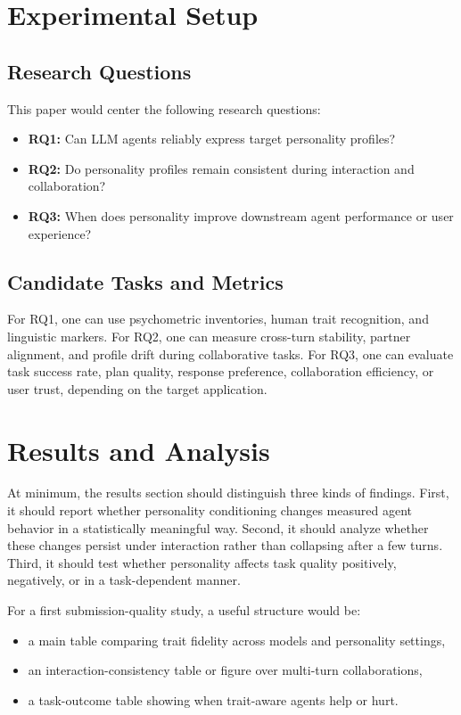 \documentclass[11pt]{article}
\begin{document}
\section{Experimental Setup}

\subsection{Research Questions}
This paper would center the following research questions:
\begin{itemize}
    \item \textbf{RQ1:} Can LLM agents reliably express target personality profiles?
    \item \textbf{RQ2:} Do personality profiles remain consistent during interaction and collaboration?
    \item \textbf{RQ3:} When does personality improve downstream agent performance or user experience?
\end{itemize}

\subsection{Candidate Tasks and Metrics}
For RQ1, one can use psychometric inventories, human trait recognition, and linguistic markers. For RQ2, one can measure cross-turn stability, partner alignment, and profile drift during collaborative tasks. For RQ3, one can evaluate task success rate, plan quality, response preference, collaboration efficiency, or user trust, depending on the target application.


\section{Results and Analysis}
At minimum, the results section should distinguish three kinds of findings. First, it should report whether personality conditioning changes measured agent behavior in a statistically meaningful way. Second, it should analyze whether these changes persist under interaction rather than collapsing after a few turns. Third, it should test whether personality affects task quality positively, negatively, or in a task-dependent manner.

For a first submission-quality study, a useful structure would be:
\begin{itemize}
    \item a main table comparing trait fidelity across models and personality settings,
    \item an interaction-consistency table or figure over multi-turn collaborations,
    \item a task-outcome table showing when trait-aware agents help or hurt.
\end{itemize}
\end{document}
